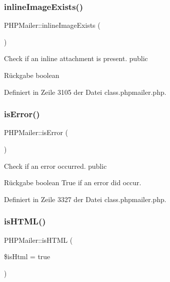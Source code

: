 \subsubsection{\texorpdfstring{inline\+Image\+Exists()}{inlineImageExists()}}
{\footnotesize\ttfamily P\+H\+P\+Mailer\+::inline\+Image\+Exists (\begin{DoxyParamCaption}{ }\end{DoxyParamCaption})}

Check if an inline attachment is present.  public \begin{DoxyReturn}{Rückgabe}
boolean 
\end{DoxyReturn}


Definiert in Zeile 3105 der Datei class.\+phpmailer.\+php.

\mbox{\label{class_p_h_p_mailer_ae781c666caa03737687dd67232824582}} 
\subsubsection{\texorpdfstring{is\+Error()}{isError()}}
{\footnotesize\ttfamily P\+H\+P\+Mailer\+::is\+Error (\begin{DoxyParamCaption}{ }\end{DoxyParamCaption})}

Check if an error occurred.  public \begin{DoxyReturn}{Rückgabe}
boolean True if an error did occur. 
\end{DoxyReturn}


Definiert in Zeile 3327 der Datei class.\+phpmailer.\+php.

\mbox{\label{class_p_h_p_mailer_aaa2f1d7b49eb316e3567773c01770377}} 
\subsubsection{\texorpdfstring{is\+H\+T\+M\+L()}{isHTML()}}
{\footnotesize\ttfamily P\+H\+P\+Mailer\+::is\+H\+T\+ML (\begin{DoxyParamCaption}\item[{}]{\$is\+Html = {\ttfamily true} }\end{DoxyParamCaption})}

